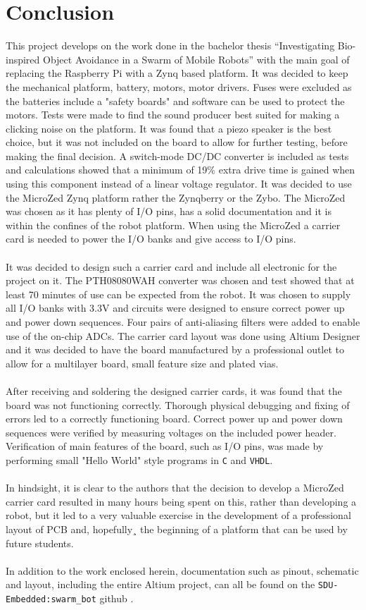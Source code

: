 \section{Conclusion}
This project develops on the work done in the bachelor thesis ``Investigating Bio-inspired Object Avoidance in a Swarm of Mobile Robots'' with the main goal of replacing the Raspberry Pi with a Zynq based platform.
It was decided to keep the mechanical platform, battery, motors, motor drivers.
Fuses were excluded as the batteries include a "safety boards" and software can be used to protect the motors.
Tests were made to find the sound producer best suited for making a clicking noise on the platform.
It was found that a piezo speaker is the best choice, but it was not included on the board to allow for further testing, before making the final decision.
A switch-mode DC/DC converter is included as tests and calculations showed that a minimum of 19\% extra drive time is gained when using this component instead of a linear voltage regulator.
It was decided to use the MicroZed Zynq platform rather the Zynqberry or the Zybo.
The MicroZed was chosen as it has plenty of I/O pins, has a solid documentation and it is within the confines of the robot platform.
When using the MicroZed a carrier card is needed to power the I/O banks and give access to I/O pins.
\\~\\
It was decided to design such a carrier card and include all electronic for the project on it. 
The PTH08080WAH converter was chosen and test showed that at least 70 minutes of use can be expected from the robot.
It was chosen to supply all I/O banks with 3.3V and circuits were designed to ensure correct power up and power down sequences. 
Four pairs of anti-aliasing filters were added to enable use of the on-chip ADCs. 
The carrier card layout was done using Altium Designer and it was decided to have the board manufactured by a professional outlet to allow for a multilayer board, small feature size and plated vias.
\\~\\
After receiving and soldering the designed carrier cards, it was found that the board was not functioning correctly.
Thorough physical debugging and fixing of errors led to a correctly functioning board. 
Correct power up and power down sequences were verified by measuring voltages on the included power header. 
Verification of main features of the board, such as I/O pins, was made by performing small "Hello World" style programs in \texttt{C} and \texttt{VHDL}.
\\~\\
In hindsight, it is clear to the authors that the decision to develop a MicroZed carrier card resulted in many hours being spent on this, rather than developing a robot, but it led to a very valuable exercise in the development of a professional layout of PCB and, hopefully¸ the beginning of a platform that can be used by future students.
\\~\\
In addition to the work enclosed herein, documentation such as pinout, schematic and layout, including the entire Altium project, can all be found on the \texttt{SDU-Embedded:swarm\_bot} github \cite{github}.